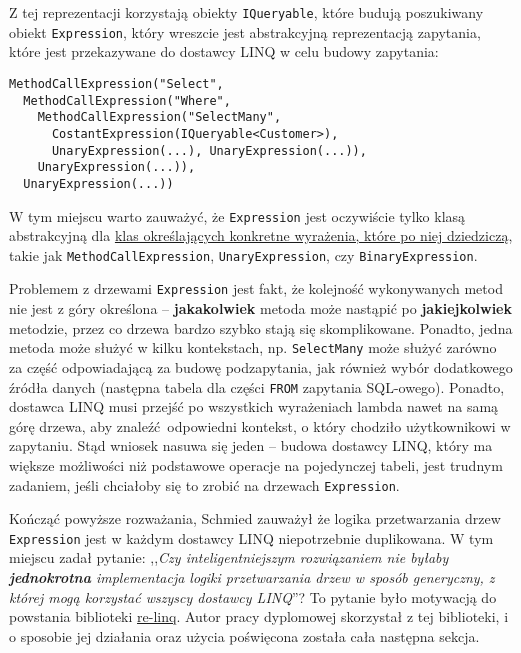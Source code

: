 Z tej reprezentacji korzystają obiekty \texttt{IQueryable}, które budują poszukiwany obiekt \texttt{Expression}, który wreszcie jest abstrakcyjną reprezentacją zapytania, które jest przekazywane do dostawcy LINQ w celu budowy zapytania:

\begin{lstlisting}
MethodCallExpression("Select",
  MethodCallExpression("Where",
    MethodCallExpression("SelectMany",
      CostantExpression(IQueryable<Customer>),
      UnaryExpression(...), UnaryExpression(...)),
    UnaryExpression(...)),
  UnaryExpression(...))
\end{lstlisting}

W tym miejscu warto zauważyć, że \texttt{Expression} jest oczywiście tylko klasą abstrakcyjną dla \href{https://msdn.microsoft.com/en-us/library/system.linq.expressions.expression(v=vs.110).aspx}{klas określających konkretne wyrażenia, które po niej dziedziczą}, takie jak \texttt{MethodCallExpression}, \texttt{UnaryExpression}, czy \texttt{BinaryExpression}.

Problemem z drzewami \texttt{Expression} jest fakt, że kolejność wykonywanych metod nie jest z góry określona – \textbf{jakakolwiek} metoda może nastąpić po \textbf{jakiejkolwiek} metodzie, przez co drzewa bardzo szybko stają się skomplikowane. Ponadto, jedna metoda może służyć w kilku kontekstach, np. \texttt{SelectMany} może służyć zarówno za część odpowiadającą za budowę podzapytania, jak również wybór dodatkowego źródła danych (następna tabela dla części \texttt{FROM} zapytania SQL-owego). Ponadto, dostawca LINQ musi przejść po wszystkich wyrażeniach lambda nawet na samą górę drzewa, aby znaleźć odpowiedni kontekst, o który chodziło użytkownikowi w zapytaniu. Stąd wniosek nasuwa się jeden – budowa dostawcy LINQ, który ma większe możliwości niż podstawowe operacje na pojedynczej tabeli, jest trudnym zadaniem, jeśli chciałoby się to zrobić na drzewach \texttt{Expression}.

Kończąć powyższe rozważania, Schmied zauważył że logika przetwarzania drzew \texttt{Expression} jest w każdym dostawcy LINQ niepotrzebnie duplikowana. W tym miejscu zadał pytanie: ,,\textit{Czy inteligentniejszym rozwiązaniem nie byłaby \textbf{jednokrotna} implementacja logiki przetwarzania drzew w sposób generyczny, z której mogą korzystać wszyscy dostawcy LINQ}''? To pytanie było motywacją do powstania biblioteki \href{https://github.com/re-motion/Relinq}{re-linq}. Autor pracy dyplomowej skorzystał z tej biblioteki, i o sposobie jej działania oraz użycia poświęcona została cała następna sekcja. 

